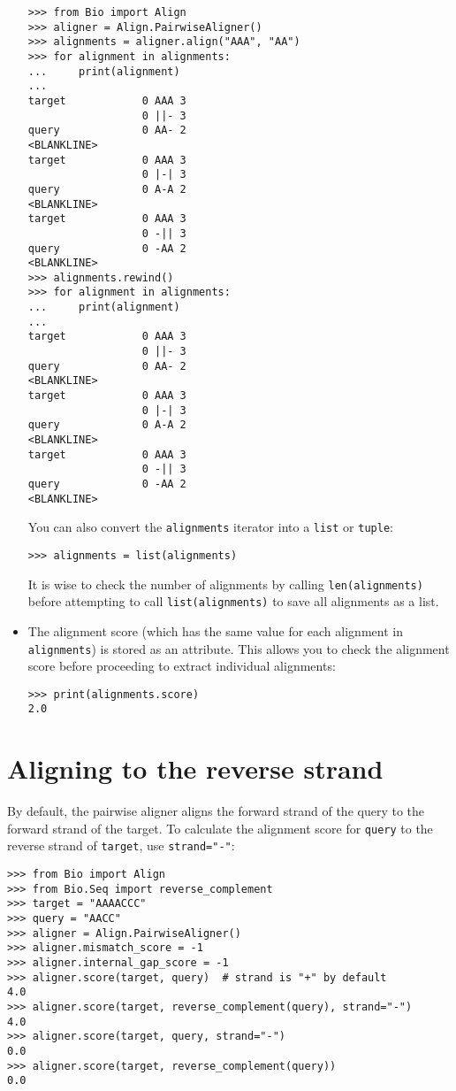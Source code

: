 \begin{itemize}
\begin{verbatim}
>>> from Bio import Align
>>> aligner = Align.PairwiseAligner()
>>> alignments = aligner.align("AAA", "AA")
>>> for alignment in alignments:
...     print(alignment)
...
target            0 AAA 3
                  0 ||- 3
query             0 AA- 2
<BLANKLINE>
target            0 AAA 3
                  0 |-| 3
query             0 A-A 2
<BLANKLINE>
target            0 AAA 3
                  0 -|| 3
query             0 -AA 2
<BLANKLINE>
>>> alignments.rewind()
>>> for alignment in alignments:
...     print(alignment)
...
target            0 AAA 3
                  0 ||- 3
query             0 AA- 2
<BLANKLINE>
target            0 AAA 3
                  0 |-| 3
query             0 A-A 2
<BLANKLINE>
target            0 AAA 3
                  0 -|| 3
query             0 -AA 2
<BLANKLINE>
\end{verbatim}
You can also convert the \verb+alignments+ iterator into a \verb+list+ or \verb+tuple+:
\begin{verbatim}
>>> alignments = list(alignments)
\end{verbatim}
It is wise to check the number of alignments by calling \verb+len(alignments)+ before attempting to call \verb+list(alignments)+ to save all alignments as a list.
\item The alignment score (which has the same value for each alignment in \verb+alignments+) is stored as an attribute. This allows you to check the alignment score before proceeding to extract individual alignments:

\begin{verbatim}
>>> print(alignments.score)
2.0
\end{verbatim}
\end{itemize}

\section{Aligning to the reverse strand}

By default, the pairwise aligner aligns the forward strand of the query to the forward strand of the target. To calculate the alignment score for \verb+query+ to the reverse strand of \verb+target+, use \verb+strand="-"+:
\begin{verbatim}
>>> from Bio import Align
>>> from Bio.Seq import reverse_complement
>>> target = "AAAACCC"
>>> query = "AACC"
>>> aligner = Align.PairwiseAligner()
>>> aligner.mismatch_score = -1
>>> aligner.internal_gap_score = -1
>>> aligner.score(target, query)  # strand is "+" by default
4.0
>>> aligner.score(target, reverse_complement(query), strand="-")
4.0
>>> aligner.score(target, query, strand="-")
0.0
>>> aligner.score(target, reverse_complement(query))
0.0

\end{verbatim}

